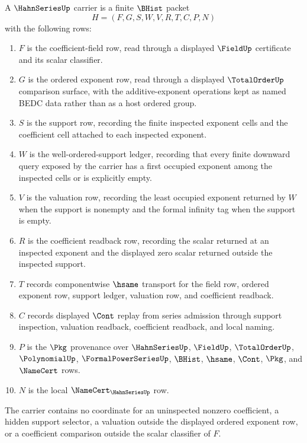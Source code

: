 \begin{definition}
\label{def:hahn-series-carrier}
A $\HahnSeriesUp$ carrier is a finite $\BHist$ packet
$$
H=(F,G,S,W,V,R,T,C,P,N)
$$
with the following rows:
\begin{enumerate}
\item $F$ is the coefficient-field row, read through a displayed $\FieldUp$ certificate and its scalar classifier.
\item $G$ is the ordered exponent row, read through a displayed $\TotalOrderUp$ comparison surface, with the additive-exponent operations kept as named BEDC data rather than as a host ordered group.
\item $S$ is the support row, recording the finite inspected exponent cells and the coefficient cell attached to each inspected exponent.
\item $W$ is the well-ordered-support ledger, recording that every finite downward query exposed by the carrier has a first occupied exponent among the inspected cells or is explicitly empty.
\item $V$ is the valuation row, recording the least occupied exponent returned by $W$ when the support is nonempty and the formal infinity tag when the support is empty.
\item $R$ is the coefficient readback row, recording the scalar returned at an inspected exponent and the displayed zero scalar returned outside the inspected support.
\item $T$ records componentwise $\hsame$ transport for the field row, ordered exponent row, support ledger, valuation row, and coefficient readback.
\item $C$ records displayed $\Cont$ replay from series admission through support inspection, valuation readback, coefficient readback, and local naming.
\item $P$ is the $\Pkg$ provenance over $\HahnSeriesUp$, $\FieldUp$, $\TotalOrderUp$, $\PolynomialUp$, $\FormalPowerSeriesUp$, $\BHist$, $\hsame$, $\Cont$, $\Pkg$, and $\NameCert$ rows.
\item $N$ is the local $\NameCert_{\HahnSeriesUp}$ row.
\end{enumerate}
The carrier contains no coordinate for an uninspected nonzero coefficient, a hidden support selector, a valuation outside the displayed ordered exponent row, or a coefficient comparison outside the scalar classifier of $F$.
\end{definition}

